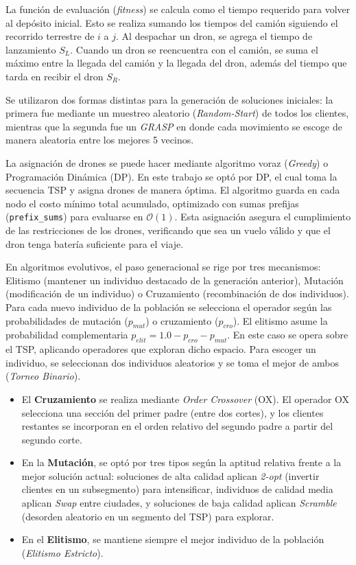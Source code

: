 La función de evaluación (\textit{fitness}) se calcula como el tiempo requerido para volver al depósito inicial. Esto se realiza sumando los tiempos del camión siguiendo el recorrido terrestre de $i$ a $j$. Al despachar un dron, se agrega el tiempo de lanzamiento $S_L$. Cuando un dron se reencuentra con el camión, se suma el máximo entre la llegada del camión y la llegada del dron, además del tiempo que tarda en recibir el dron $S_R$.

Se utilizaron dos formas distintas para la generación de soluciones iniciales: la primera fue mediante un muestreo aleatorio (\textit{Random-Start}) de todos los clientes, mientras que la segunda fue un \textit{GRASP} en donde cada movimiento se escoge de manera aleatoria entre los mejores 5 vecinos.

La asignación de drones se puede hacer mediante algoritmo voraz (\textit{Greedy}) o Programación Dinámica (DP). En este trabajo se optó por DP, el cual toma la secuencia TSP y asigna drones de manera óptima. El algoritmo guarda en cada nodo el costo mínimo total acumulado, optimizado con sumas prefijas (\texttt{prefix\_sums}) para evaluarse en $\mathcal{O}(1)$. Esta asignación asegura el cumplimiento de las restricciones de los drones, verificando que sea un vuelo válido y que el dron tenga batería suficiente para el viaje.

En algoritmos evolutivos, el paso generacional se rige por tres mecanismos: Elitismo (mantener un individuo destacado de la generación anterior), Mutación (modificación de un individuo) o Cruzamiento (recombinación de dos individuos). Para cada nuevo individuo de la población se selecciona el operador según las probabilidades de mutación ($p_{mut}$) o cruzamiento ($p_{cro}$). El elitismo asume la probabilidad complementaria $p_{elit} = 1.0 - p_{cro} - p_{mut}$. En este caso se opera sobre el TSP, aplicando operadores que exploran dicho espacio. Para escoger un individuo, se seleccionan dos individuos aleatorios y se toma el mejor de ambos (\textit{Torneo Binario}).

\begin{itemize}
	\item El \textbf{Cruzamiento} se realiza mediante \textit{Order Crossover} (OX). El operador OX selecciona una sección del primer padre (entre dos cortes), y los clientes restantes se incorporan en el orden relativo del segundo padre a partir del segundo corte.
	\item En la \textbf{Mutación}, se optó por tres tipos según la aptitud relativa frente a la mejor solución actual: soluciones de alta calidad aplican \textit{2-opt} (invertir clientes en un subsegmento) para intensificar, individuos de calidad media aplican \textit{Swap} entre ciudades, y soluciones de baja calidad aplican \textit{Scramble} (desorden aleatorio en un segmento del TSP) para explorar.
	\item En el \textbf{Elitismo}, se mantiene siempre el mejor individuo de la población (\textit{Elitismo Estricto}).
\end{itemize}

